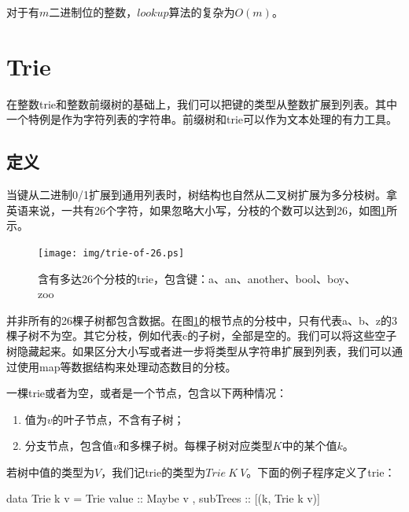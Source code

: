 \documentclass[b5paper]{ctexart}
\begin{document}
对于有$m$二进制位的整数，$lookup$算法的复杂为$O(m)$。

\begin{Exercise}
\end{Exercise}

\section{Trie}

在整数trie和整数前缀树的基础上，我们可以把键的类型从整数扩展到列表。其中一个特例是作为字符列表的字符串。前缀树和trie可以作为文本处理的有力工具。

\subsection{定义}
当键从二进制0/1扩展到通用列表时，树结构也自然从二叉树扩展为多分枝树。拿英语来说，一共有26个字符，如果忽略大小写，分枝的个数可以达到26，如图\ref{fig:trie-of-26}所示。

\begin{figure}[htbp]
  \centering
  \texttt{[image: img/trie-of-26.ps]}
  \caption{含有多达26个分枝的trie，包含键：a、an、another、bool、boy、zoo}
  \label{fig:trie-of-26}
\end{figure}

并非所有的26棵子树都包含数据。在图\ref{fig:trie-of-26}的根节点的分枝中，只有代表a、b、z的3棵子树不为空。其它分枝，例如代表c的子树，全部是空的。我们可以将这些空子树隐藏起来。如果区分大小写或者进一步将类型从字符串扩展到列表，我们可以通过使用map等数据结构来处理动态数目的分枝。

一棵trie或者为空，或者是一个节点，包含以下两种情况：

\begin{enumerate}
\item 值为$v$的叶子节点，不含有子树；
\item 分支节点，包含值$v$和多棵子树。每棵子树对应类型$K$中的某个值$k$。
\end{enumerate}

若树中值的类型为$V$，我们记trie的类型为$Trie\ K\ V$。下面的例子程序定义了trie：

\begin{Haskell}
data Trie k v = Trie { value :: Maybe v
                     , subTrees :: [(k, Trie k v)]}
\end{Haskell}
\end{document}
